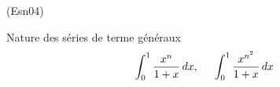 \begin{tiny}(Esn04)\end{tiny} Nature des séries de terme généraux
\begin{displaymath}
  \int_0^{1}\frac{x^n}{1+x}\,dx , \hspace{0.5cm}
  \int_0^{1}\frac{x^{n^2}}{1+x}\,dx 
\end{displaymath}
